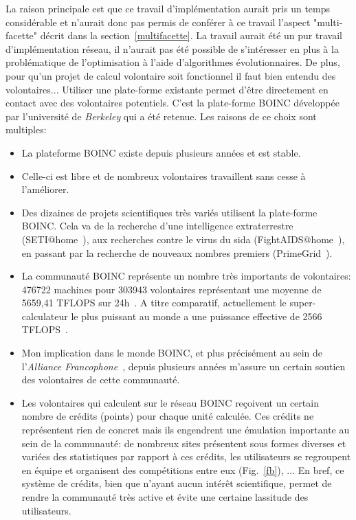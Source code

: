 \documentclass[a4paper, 12pt]{report}
\begin{document}
La raison principale est que ce travail d'implémentation aurait pris un temps considérable et n'aurait donc pas permis de conférer à ce travail l'aspect "multi-facette" décrit dans la section~\ref{multifacette}. La travail aurait été un pur travail d'implémentation réseau, il n'aurait pas été possible de s'intéresser en plus à la problématique de l'optimisation à l'aide d'algorithmes évolutionnaires. De plus, pour qu'un projet de calcul volontaire soit fonctionnel il faut bien entendu des volontaires... Utiliser une plate-forme existante permet d'être directement en contact avec des volontaires potentiels.
\newpage
C'est la plate-forme \textsc{BOINC} développée par l'université de \textit{Berkeley} qui a été retenue. Les raisons de ce choix sont multiples:
\begin{itemize}
\item La plateforme \textsc{BOINC} existe depuis plusieurs années et est stable.
\item Celle-ci est libre et de nombreux volontaires travaillent sans cesse à l'améliorer.
\item Des dizaines de projets scientifiques très variés utilisent la plate-forme \textsc{BOINC}. Cela va de la recherche d'une intelligence extraterrestre (SETI@home~\cite{SETI}), aux recherches contre le virus du sida (FightAIDS@home~\cite{FIGHTAIDS}), en passant par la recherche de nouveaux nombres premiers (PrimeGrid~\cite{PRIMEGRID}).
\item La communauté \textsc{BOINC} représente un nombre très importants de volontaires: 476722 machines pour 303943 volontaires représentant une moyenne de 5659,41 TFLOPS sur 24h~\cite{BOINC}. A titre comparatif, actuellement le super-calculateur le plus puissant au monde a une puissance effective de 2566 TFLOPS~\cite{TOP500}.
\item Mon implication dans le monde \textsc{BOINC}, et plus précisément au sein de l'\textit{Alliance Francophone}~\cite{AF}, depuis plusieurs années m'assure un certain soutien des volontaires de cette communauté.
\item Les volontaires qui calculent sur le réseau \textsc{BOINC} reçoivent un certain nombre de crédits (points) pour chaque unité calculée. Ces crédits ne représentent rien de concret mais ils engendrent une émulation importante au sein de la communauté: de nombreux sites présentent sous formes diverses et variées des statistiques par rapport à ces crédits, les utilisateurs se regroupent en équipe et organisent des compétitions entre eux (Fig.~\ref{fb}), ... En bref, ce système de crédits, bien que n'ayant aucun intérêt scientifique, permet de rendre la communauté très active et évite une certaine lassitude des utilisateurs.\label{credits}
\end{itemize}
\end{document}
